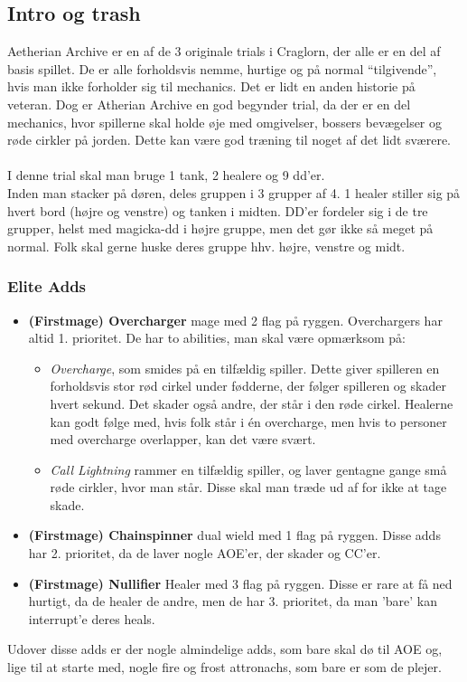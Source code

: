 \subsection{Intro og trash}
Aetherian Archive er en af de 3 originale trials i Craglorn, der alle er en del
af basis spillet. De er alle forholdsvis nemme, hurtige og på normal
``tilgivende'', hvis man ikke forholder sig til mechanics. Det er lidt en anden
historie på veteran. Dog er Atherian Archive en god begynder trial, da der er
en del mechanics, hvor spillerne skal holde øje med omgivelser, bossers
bevægelser og røde cirkler på jorden. Dette kan være god træning til noget af
det lidt sværere.\\
\\
I denne trial skal man bruge 1 tank, 2 healere og 9 dd'er.\\
Inden man stacker på døren, deles gruppen i 3 grupper af 4. 1 healer stiller
sig på hvert bord (højre og venstre) og tanken i midten. DD'er fordeler sig i
de tre grupper, helst med magicka-dd i højre gruppe, men det gør ikke så meget
på normal. Folk skal gerne huske deres gruppe hhv. højre, venstre og midt.
\subsubsection*{Elite Adds}
\begin{itemize}
  \item \textbf{(Firstmage) Overcharger} mage med 2 flag på ryggen.
    Overchargers har altid 1. prioritet. De har to abilities, man skal være
    opmærksom på: 
    \begin{itemize}
      \item \emph{Overcharge}, som smides på en tilfældig spiller. Dette
        giver spilleren en forholdsvis stor rød cirkel under fødderne, der følger
        spilleren og skader hvert sekund. Det skader også andre, der står i den
        røde cirkel. Healerne kan godt følge med, hvis folk står i én
        overcharge, men hvis to personer med overcharge overlapper, kan det
        være svært.
      \item \emph{Call Lightning} rammer en tilfældig spiller, og laver
        gentagne gange små røde cirkler, hvor man står. Disse skal man træde ud 
        af for ikke at tage skade.
    \end{itemize}
  \item \textbf{(Firstmage) Chainspinner} dual wield med 1 flag på ryggen.
    Disse adds har 2. prioritet, da de laver nogle AOE'er, der skader og
    CC'er. 
  \item \textbf{(Firstmage) Nullifier} Healer med 3 flag på ryggen. Disse er
    rare at få ned hurtigt, da de healer de andre, men de har 3. prioritet, da
    man 'bare' kan interrupt'e deres heals.
\end{itemize}
Udover disse adds er der nogle almindelige adds, som bare skal dø til AOE og,
lige til at starte med, nogle fire og frost attronachs, som bare er som de
plejer. 
